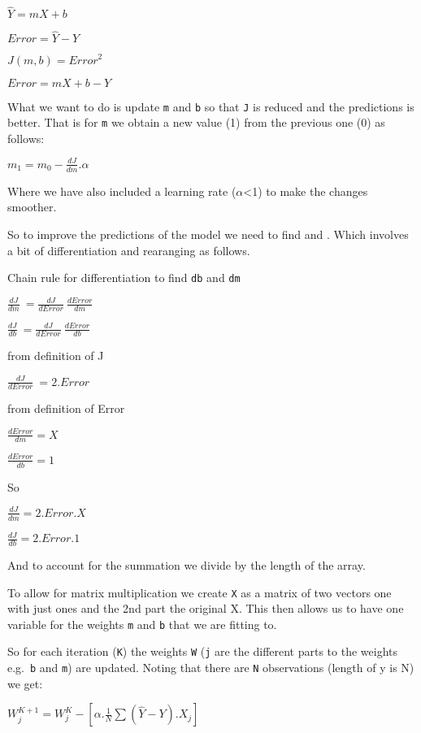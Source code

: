 \documentclass[
  letterpaper,
  DIV=11,
  numbers=noendperiod]{scrartcl}
\begin{document}
\(\hat{Y}= mX +b\)

\(Error = \hat{Y} - Y\)

\(J(m,b) = Error^2\)

\(Error = mX + b - Y\)

What we want to do is update \texttt{m} and \texttt{b} so that
\texttt{J} is reduced and the predictions is better. That is for
\texttt{m} we obtain a new value (1) from the previous one (0) as
follows:

\(m_1 = m_0 - \frac{dJ}{dm} . \alpha\)

Where we have also included a learning rate (\(\alpha\)\textless1) to
make the changes smoother.

So to improve the predictions of the model we need to find 
and . Which involves a bit of differentiation and
rearanging as follows.

Chain rule for differentiation to find \texttt{db} and \texttt{dm}

\(\frac{dJ}{dm}\ = \frac{dJ}{dError}\ \frac{dError}{dm}\)

\(\frac{dJ}{db}\ = \frac{dJ}{dError}\ \frac{dError}{db}\)

from definition of J

\(\frac{dJ}{dError}\ = 2 . Error\)

from definition of Error

\(\frac{dError}{dm} = X\)

\(\frac{dError}{db} = 1\)

So

\(\frac{dJ}{dm} = 2 . Error . X\)

\(\frac{dJ}{db} = 2 . Error . 1\)

And to account for the summation we divide by the length of the array.

To allow for matrix multiplication we create \texttt{X} as a matrix of
two vectors one with just ones and the 2nd part the original X. This
then allows us to have one variable for the weights \texttt{m} and
\texttt{b} that we are fitting to.

So for each iteration (\texttt{K}) the weights \texttt{W} (\texttt{j}
are the different parts to the weights e.g.~\texttt{b} and \texttt{m})
are updated. Noting that there are \texttt{N} observations (length of y
is N) we get:

\(W_j^{K+1} = W_j^{K} - [\alpha . \frac{1}{N}\sum(\hat{Y}-Y).X_j]\)
\end{document}
